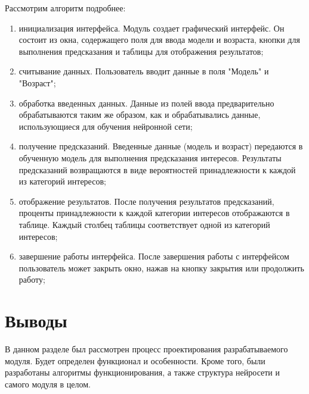 Рассмотрим алгоритм подробнее:
\begin{enumerate}
    \item  инициализация интерфейса. Модуль создает графический интерфейс. Он состоит из окна, содержащего поля для ввода модели и возраста, кнопки для выполнения предсказания и таблицы для отображения результатов;
    \item  считывание данных. Пользователь вводит данные в поля "Модель" и "Возраст";
    \item  обработка введенных данных. Данные из полей ввода предварительно обрабатываются таким же образом, как и обрабатывались данные, использующиеся для обучения нейронной сети;
    \item  получение предсказаний. Введенные данные (модель и возраст) передаются в обученную модель для выполнения предсказания интересов. Результаты предсказаний возвращаются в виде вероятностей принадлежности к каждой из категорий интересов;
    \item  отображение результатов. После получения результатов предсказаний, проценты принадлежности к каждой категории интересов отображаются в таблице. Каждый столбец таблицы соответствует одной из категорий интересов;
    \item  завершение работы интерфейса. После завершения работы с интерфейсом пользователь может закрыть окно, нажав на кнопку закрытия или продолжить работу;
\end{enumerate}


\section*{Выводы}

В данном разделе был рассмотрен процесс проектирования разрабатываемого модуля. Будет определен функционал и особенности. Кроме того, были разработаны алгоритмы функционирования, а также структура нейросети и самого модуля в целом.
